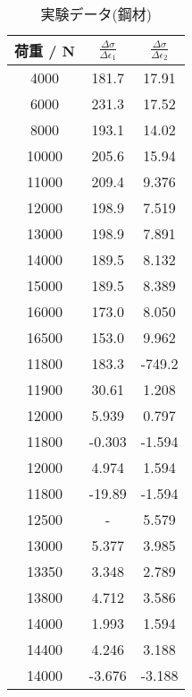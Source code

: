 \begin{table}[h]
   \caption{実験データ(鋼材)}
   \label{tab:data_steel_2}
   \centering
   \begin{tabular}{ccc}
     \hline
     荷重 / N&$\frac{\Delta\sigma}{\Delta\epsilon_1}$&$\frac{\Delta\sigma}{\Delta\epsilon_2}$\\
     \hline \hline
     4000 & 181.7 & 17.91 \\
6000 & 231.3 & 17.52 \\
8000 & 193.1 & 14.02 \\
10000 & 205.6 & 15.94 \\
11000 & 209.4 & 9.376 \\
12000 & 198.9 & 7.519 \\
13000 & 198.9 & 7.891 \\
14000 & 189.5 & 8.132 \\
15000 & 189.5 & 8.389 \\
16000 & 173.0 & 8.050 \\
16500 & 153.0 & 9.962 \\
11800 & 183.3 & -749.2 \\
11900 & 30.61 & 1.208 \\
12000 & 5.939 & 0.797 \\
11800 & -0.303 & -1.594 \\
12000 & 4.974 & 1.594 \\
11800 & -19.89 & -1.594 \\
12500 & - & 5.579 \\
13000 & 5.377 & 3.985 \\
13350 & 3.348 & 2.789 \\
13800 & 4.712 & 3.586 \\
14000 & 1.993 & 1.594 \\
14400 & 4.246 & 3.188 \\
14000 & -3.676 & -3.188\\
     \hline
   \end{tabular}
\end{table}
